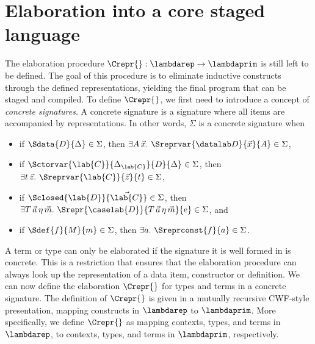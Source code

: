 \section{Elaboration into a core staged language}\label{sec:elaboration}

The elaboration procedure $\Crepr{} : \lambdarep \to \lambdaprim$ is still left
to be defined. The goal of this procedure is to eliminate inductive constructs
through the defined representations, yielding the final program that can be
staged and compiled. To define $\Crepr{}$, we first need to introduce a concept
of \emph{concrete signatures}. A concrete signature is a signature where all
items are accompanied by representations. In other words, $\Sigma$ is a
concrete signature when
\begin{itemize}
  \item if $\Sdata{D}{\Delta} \in \Sigma$, then $\exists A \, \vec{x} .\
          \Sreprvar{\datalab D}{\vec{x}}{A} \in \Sigma$,
  \item if $\Sctorvar{\lab{C}}{\Delta_{\lab{C}}}{D}{\Delta} \in \Sigma$, then $\exists
          t\,\vec{z} .\ \Sreprvar{\lab{C}}{\vec{z}}{t} \in \Sigma$,
  \item if $\Sclosed{\lab{D}}{\vec{\lab{C}}} \in \Sigma$, then $\exists
          T\,\vec{a}\,\eta\,\vec{m} .\ \Srepr{\caselab{D}}{T\,\vec{a}\,\eta\,\vec{m} }{e}
          \in \Sigma$, and
  \item if $\Sdef{f}{M}{m} \in \Sigma$, then $\exists a .\ \Sreprconst{f}{a} \in
          \Sigma$.
\end{itemize}
A term or type can only be elaborated if the signature it is well formed in is
concrete. This is a restriction that ensures that the elaboration procedure
can always look up the representation of a data item, constructor or definition.
We can now define the elaboration $\Crepr{}$ for types and terms in a concrete
signature. The definition of $\Crepr{}$ is given in a mutually recursive
CWF-style presentation, mapping constructs in $\lambdarep$ to $\lambdaprim$.
More specifically, we define $\Crepr{}$ as mapping contexts, types, and terms in 
$\lambdarep$, to contexts, types, and terms in $\lambdaprim$, respectively.

